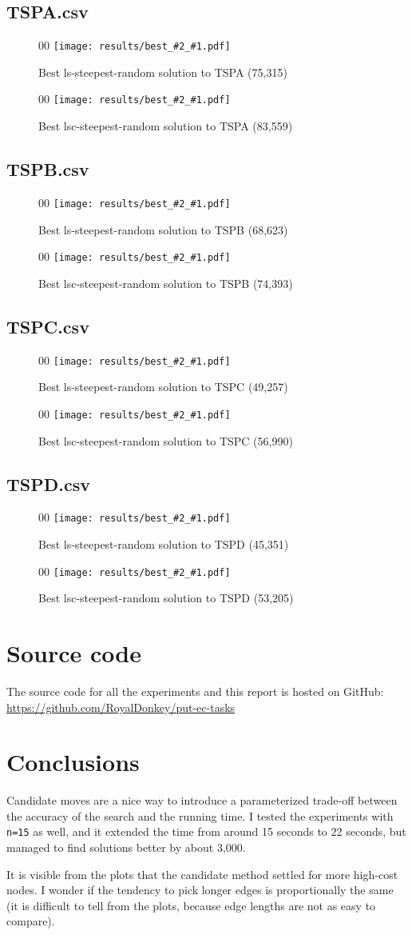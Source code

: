 \documentclass[14pt]{article}
\begin{document}
\newcommand{\visualization}[3]{%
\begin{figure}[H]%
	\begin{adjustwidth}{0}{0}%
		\texttt{[image: results/best\_\#2\_\#1.pdf]}%
	\end{adjustwidth}%
	\vspace{-12mm}%
	\caption{Best #2 solution to #1 (#3)}%
\end{figure}%
}

\subsection{TSPA.csv}
\visualization{TSPA}{ls-steepest-random}{75,315}
\visualization{TSPA}{lsc-steepest-random}{83,559}

\subsection{TSPB.csv}
\visualization{TSPB}{ls-steepest-random}{68,623}
\visualization{TSPB}{lsc-steepest-random}{74,393}

\subsection{TSPC.csv}
\visualization{TSPC}{ls-steepest-random}{49,257}
\visualization{TSPC}{lsc-steepest-random}{56,990}

\subsection{TSPD.csv}
\visualization{TSPD}{ls-steepest-random}{45,351}
\visualization{TSPD}{lsc-steepest-random}{53,205}

\section{Source code}
The source code for all the experiments and this report is hosted on GitHub: \\
\url{https://github.com/RoyalDonkey/put-ec-tasks}

\section{Conclusions}
Candidate moves are a nice way to introduce a parameterized trade-off between
the accuracy of the search and the running time. I tested the experiments with
\verb`n=15` as well, and it extended the time from around 15 seconds to 22
seconds, but managed to find solutions better by about 3,000.

It is visible from the plots that the candidate method settled for more
high-cost nodes. I wonder if the tendency to pick longer edges is
proportionally the same (it is difficult to tell from the plots, because edge
lengths are not as easy to compare).
\end{document}
